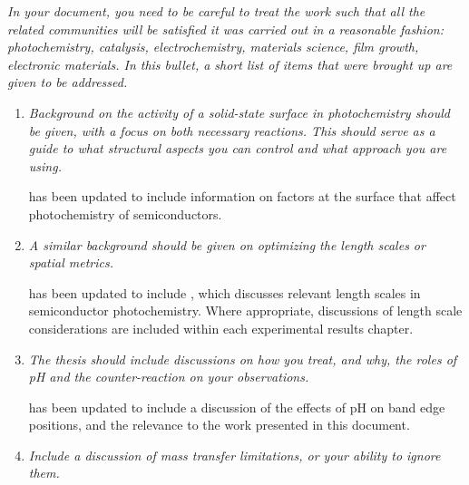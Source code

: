 \documentclass[12pt,%
               letterpaper,
               oneside]{uiothesis}
\begin{document}
\begin{enum}
  \item \emph{In your document, you need to be careful to treat the work such that all the
related communities will be satisfied it was carried out in a reasonable fashion:
photochemistry, catalysis, electrochemistry, materials science, film growth, electronic
materials. In this bullet, a short list of items that were brought up are given to be
addressed.} \vspace{8pt}
  
  \begin{enumerate}[label=\alph*,leftmargin=1em]
  \item \emph{Background on the activity of a solid-state surface in photochemistry should
be given, with a focus on both necessary reactions. This should serve as a guide to what
structural aspects you can control and what approach you are using.}\vspace{16pt}
  
     has been updated to include information on factors at the
surface that affect photochemistry of semiconductors.\vspace{16pt}
  
  \item \emph{A similar background should be given on optimizing the length scales or
spatial metrics.}\vspace{8pt}
  
   has been updated to include
, which discusses relevant length scales in
semiconductor photochemistry. Where appropriate, discussions of length scale
considerations are included within each experimental results chapter.\vspace{16pt}
  
  \item \emph{The thesis should include discussions on how you treat, and why, the roles
of pH and the counter-reaction on your observations.}\vspace{8pt}
  
   has been updated to include a discussion of the
effects of pH on band edge positions, and the relevance to the work presented in this
document.
  
  \vspace{16pt}
  
  \item \emph{Include a discussion of mass transfer limitations, or your ability to ignore
them.}\vspace{8pt}
  

\end{enumerate}
\end{enum}
\end{document}
